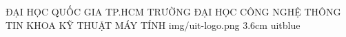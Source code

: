 


\makeuniversitycover
  {ĐẠI HỌC QUỐC GIA TP.HCM}
  {TRƯỜNG ĐẠI HỌC CÔNG NGHỆ THÔNG TIN}
  {KHOA KỸ THUẬT MÁY TÍNH}
  {img/uit-logo.png}
  {3.6cm}
  {uitblue}
